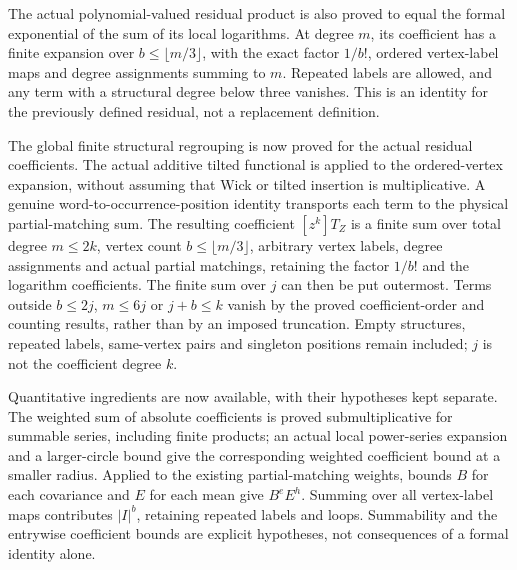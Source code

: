 \documentclass[11pt]{article}
\begin{document}
The actual polynomial-valued residual product is also proved to equal the formal exponential of the sum of its local logarithms. At degree $m$, its coefficient has a finite expansion over $b\le\lfloor m/3\rfloor$, with the exact factor $1/b!$, ordered vertex-label maps and degree assignments summing to $m$. Repeated labels are allowed, and any term with a structural degree below three vanishes. This is an identity for the previously defined residual, not a replacement definition. 

The global finite structural regrouping is now proved for the actual residual coefficients. The actual additive tilted functional is applied to the ordered-vertex expansion, without assuming that Wick or tilted insertion is multiplicative. A genuine word-to-occurrence-position identity transports each term to the physical partial-matching sum. The resulting coefficient $[z^k]T_Z$ is a finite sum over total degree $m\le2k$, vertex count $b\le\lfloor m/3\rfloor$, arbitrary vertex labels, degree assignments and actual partial matchings, retaining the factor $1/b!$ and the logarithm coefficients. The finite sum over $j$ can then be put outermost. Terms outside $b\le2j$, $m\le6j$ or $j+b\le k$ vanish by the proved coefficient-order and counting results, rather than by an imposed truncation. Empty structures, repeated labels, same-vertex pairs and singleton positions remain included; $j$ is not the coefficient degree $k$.

Quantitative ingredients are now available, with their hypotheses kept separate. The weighted sum of absolute coefficients is proved submultiplicative for summable series, including finite products; an actual local power-series expansion and a larger-circle bound give the corresponding weighted coefficient bound at a smaller radius. Applied to the existing partial-matching weights, bounds $B$ for each covariance and $E$ for each mean give $B^eE^h$. Summing over all vertex-label maps contributes $|I|^b$, retaining repeated labels and loops. Summability and the entrywise coefficient bounds are explicit hypotheses, not consequences of a formal identity alone.
\end{document}
